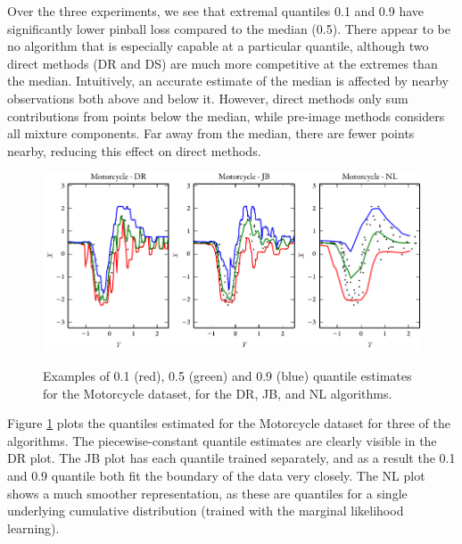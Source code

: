 \documentclass[twoside]{article} \usepackage{aistats2017}
\theoremstyle{definition}
\theoremstyle{theorem}
\begin{document}
		Over the three experiments, we see that extremal quantiles 0.1 and 0.9 have significantly lower pinball loss compared to the median (0.5). There appear to be no algorithm that is especially capable at a particular quantile, although two direct methods (DR and DS) are much more competitive at the extremes than the median. Intuitively, an accurate estimate of the median is affected by nearby observations both above and below it. However, direct methods only sum contributions from points below the median, while pre-image methods considers all mixture components. Far away from the median, there are fewer points nearby, reducing this effect on direct methods.
		
		
		\begin{figure}[t]
			\begin{center}
				\includegraphics[width=\columnwidth]{figures/mcquantilesall}\\
			\end{center}
			\caption{Examples of 0.1 (red), 0.5 (green) and 0.9 (blue) quantile estimates for the Motorcycle dataset, for the DR, JB, and NL algorithms.}
			\label{fig:motorcycleresults} 
		\end{figure}
		
		Figure \ref{fig:motorcycleresults} plots the quantiles estimated for the Motorcycle dataset for three of the algorithms. The piecewise-constant quantile estimates are clearly visible in the DR plot. The JB plot has each quantile trained separately, and as a result the 0.1 and 0.9 quantile both fit the boundary of the data very closely. The NL plot shows a much smoother representation, as these are quantiles for a single underlying cumulative distribution (trained with the marginal likelihood learning).
\end{document}
